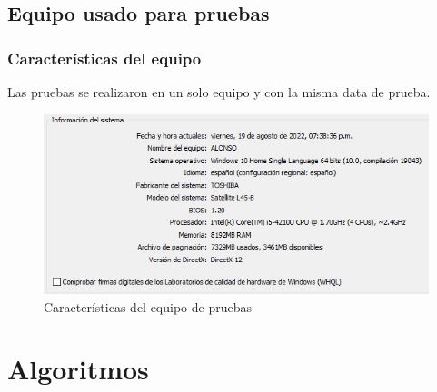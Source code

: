 \documentclass[
	11pt, %
]{beamer}
\begin{document}

\subsection{Equipo usado para pruebas}

\begin{frame}
	\frametitle{Características del equipo}
	
	Las pruebas se realizaron en un solo equipo y con la misma data de prueba.

		\begin{figure}
		\includegraphics[width=0.8\linewidth]{caracteristicas.png}
		\caption{Características del equipo de pruebas}
	   \end{figure}

\end{frame}

\section{Algoritmos}
\end{document}
